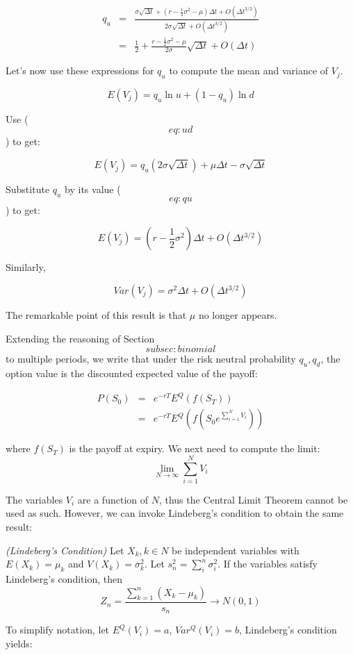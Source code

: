 \documentclass[justified]{tufte-book}
\begin{document}
\[\begin{aligned}
q_u &=& \frac{\sigma \sqrt{\Delta t} + (r-\frac{1}{2} \sigma^2 - \mu) \Delta t + O(\Delta t ^{3/2})}{2 \sigma \sqrt{\Delta t} + O(\Delta t ^{3/2})}  \nonumber \\
&=& \frac{1}{2} + \frac{r-\frac{1}{2} \sigma^2 - \mu}{2 \sigma} \sqrt{\Delta t}  + O(\Delta t)
\label{eq:qu-2}\end{aligned}\]

Let's now use these expressions for \(q_u\) to compute the mean and
variance of \(V_j\).

\[E(V_j) = q_u \ln u + (1-q_u) \ln d\]

Use (\[eq:ud\]) to get:

\[E(V_j) = q_u (2\sigma\sqrt{\Delta t}) + \mu \Delta t - \sigma \sqrt{\Delta t}\]

Substitute \(q_u\) by its value (\[eq:qu\]) to get:

\[E(V_j) = (r-\frac{1}{2} \sigma^2) \Delta t + O(\Delta t ^{3/2})\]

Similarly,

\[Var(V_j) = \sigma^2 \Delta t + O(\Delta t^{3/2})\]

The remarkable point of this result is that \(\mu\) no longer appears.

Extending the reasoning of Section~\[subsec:binomial\] to multiple
periods, we write that under the risk neutral probability \(q_u, q_d\),
the option value is the discounted expected value of the payoff:

\[\begin{aligned}
P(S_0) &=& e^{-rT} E^Q(f(S_T)) \\
 &=& e^{-rT} E^Q(f(S_0e^{\sum_{i=1}^N V_i})) \nonumber
\label{eq:pso}\end{aligned}\]

where \(f(S_T)\) is the payoff at expiry. We next need to compute the
limit: \[\lim_{N\to\infty} \sum_{i=1}^N V_i\]

The variables \(V_i\) are a function of \(N\), thus the Central Limit
Theorem cannot be used as such. However, we can invoke Lindeberg's
condition to obtain the same result:

\emph{(Lindeberg's Condition)} Let \(X_k, k \in N\) be independent variables
with \(E(X_k)=\mu_k\) and \(V(X_k) = \sigma^2_k\). Let
\(s_n^2 = \sum_i^n \sigma^2_i\). If the variables satisfy Lindeberg's
condition, then
\[Z_n = \frac{\sum_{k=1}^n (X_k - \mu_k)}{s_n} \rightarrow N(0, 1)\]

To simplify notation, let \(E^Q(V_i) = a\), \(Var^Q(V_i) = b\), Lindeberg's
condition yields:
\end{document}
